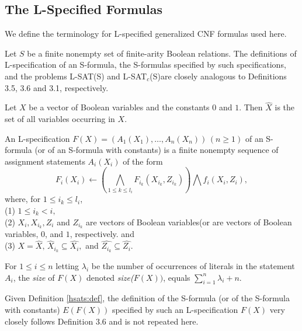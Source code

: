 \subsection{The L-Specified Formulas}\label{sec:lspec}
We define the terminology for {\sf L-}specified generalized {\sf CNF} formulas used here. 

Let $S$ be a finite nonempty set of finite-arity Boolean 
relations. The definitions of L-specification of an S-formula, the 
S-formulas specified by such specifications, and the problems 
{\sf L-SAT(S)} and {\sf L-SAT}$_c${\sf (S)}are closely analogous to Definitions
3.5, 3.6 and 3.1, respectively.

\begin{definition}
Let $X$ be a vector of Boolean variables and the constants $0$ and $1$. Then
$\hat{X}$ is the set of all variables occurring in $X.$
\end{definition}

\begin{definition}\label{hsats:def}
An {\sf L-}specification $F(X) = (A_1(X_1),\ldots, A_n(X_n))\, (n \geq 1)$ 
of an S-formula (or of an S-formula with constants) is a finite nonempty 
sequence of assignment statements $A_i(X_i)$ of the form 
\[ F_i(X_i) \leftarrow 
(\bigwedge_{1 \leq k \leq  l_i} F_{i_k}(X_{i_k},Z_{i_k})) \bigwedge 
f_i(X_i,Z_i), \]
where, for $1 \leq i_k \leq l_i$,\\
(1) $1 \leq i_k < i,$ \\
(2) $X_i, X_{i_k}, Z_i$ and $Z_{i_k}$ are vectors of Boolean variables(or are 
vectors of Boolean variables, $0$, and $1$, respectively. and \\
(3) $X = \hat{X}, \, \hat{X}_{i_k} \subseteq \hat{X_i},$ and $ \hat{Z_{i_k}} 
\subseteq \hat{Z_i}$. 

\noindent
For $1 \leq i \leq n$ letting $\lambda_i$ be the number of occurrences of
literals in the statement $A_i$, the {\em size} of $F(X)$ denoted 
{\em size($F(X))$}, equals $\sum_{i=1}^{n} \lambda_i + n$.
\end{definition}

Given Definition \ref{hsats:def}, the definition of the 
{\sf S-formula} (or of the {\sf S}-formula with constants) 
$E(F(X))$ specified
by such an  L-specification $F(X)$ very closely follows Definition 3.6 and 
is not repeated here. 






